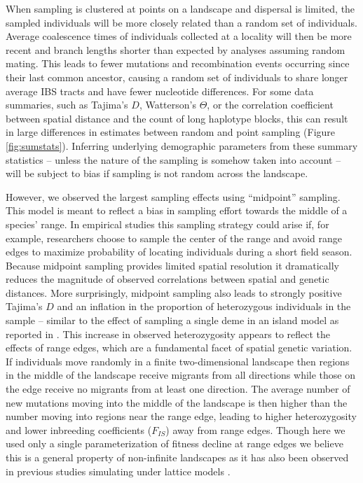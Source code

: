 \documentclass[10pt,twoside,lineno,hidelinks]{preprint}
\begin{document}
When sampling is clustered at points on a landscape and dispersal is limited, the sampled individuals will be more closely related than a random set of individuals. Average coalescence times of individuals collected at a locality will then be more recent and branch lengths shorter than expected by analyses assuming random mating. This leads to fewer mutations and recombination events occurring since their last common ancestor, causing a random set of individuals to share longer average IBS tracts and have fewer nucleotide differences. For some data summaries, such as Tajima's $D$, Watterson's $\Theta$, or the correlation coefficient between spatial distance and the count of long haplotype blocks, this can result in large differences in estimates between random and point sampling (Figure \ref{fig:sumstats}). 
Inferring underlying demographic parameters from these summary statistics 
-- unless the nature of the sampling is somehow taken into account 
-- will be subject to bias if sampling is not random across the landscape. 

However, we observed the largest sampling effects using ``midpoint'' sampling.
This model is meant to reflect a bias in sampling effort towards the middle of a species' range. 
In empirical studies this sampling strategy could arise if, for example, 
researchers choose to sample the center of the range and avoid range edges to maximize probability of locating individuals during a short field season. 
Because midpoint sampling provides limited spatial resolution it dramatically reduces the magnitude of observed correlations between spatial and genetic distances. 
More surprisingly, midpoint sampling also leads to strongly positive Tajima's $D$ and an inflation in the proportion of heterozygous individuals in the sample -- similar to the effect of sampling a single deme in an island model as reported in \citep{Stadler2009}. 
This increase in observed heterozygosity appears to reflect the effects of range edges, which are a fundamental facet of spatial genetic variation. 
If individuals move randomly in a finite two-dimensional landscape then regions in the middle of the landscape receive migrants from all directions while those on the edge receive no migrants from at least one direction. The average number of new mutations moving into the middle of the landscape is then higher than the number moving into regions near the range edge, leading to higher heterozygosity and lower inbreeding coefficients ($F_{IS}$) away from range edges. Though here we used only a single parameterization of fitness decline at range edges we believe this is a general property of non-infinite landscapes as it has also been observed in previous studies simulating under lattice models \citep{Neel2013,Shirk2014}. 
\end{document}
